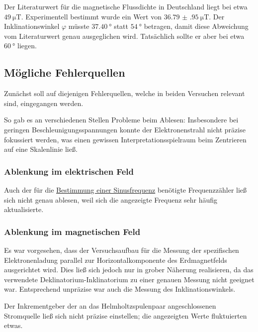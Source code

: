 Der Literaturwert für die magnetische Flussdichte in Deutschland
liegt bei etwa $\SI{49}{\micro\tesla}$. \cite{erdmagnetfeld}
Experimentell bestimmt wurde ein Wert von $\SI{36.79(95)}{\micro\tesla}$.
Der Inklinationswinkel $\varphi$ müsste $\SI{37.40}{\degree}$ statt $\SI{54}{\degree}$ betragen,
damit diese Abweichung vom Literaturwert genau ausgeglichen wird.
Tatsächlich sollte er aber bei etwa $\SI{60}{\degree}$ liegen.

\subsection{Mögliche Fehlerquellen}

Zunächst soll auf diejenigen Fehlerquellen,
welche in beiden Versuchen relevant sind,
eingegangen werden.

So gab es an verschiedenen Stellen Probleme beim Ablesen:
Insbesondere bei geringen Beschleunigungsspannungen konnte der Elektronenstrahl
nicht präzise fokussiert werden,
was einen gewissen Interpretationsspielraum beim Zentrieren auf eine Skalenlinie ließ.


\subsubsection*{Ablenkung im elektrischen Feld}

Auch der für die \hyperref[sec:auswertung:501:frequenz]{Bestimmung einer Sinusfrequenz}
benötigte Frequenzzähler ließ sich nicht genau ablesen,
weil sich die angezeigte Frequenz sehr häufig aktualisierte.


\subsubsection*{Ablenkung im magnetischen Feld}

Es war vorgesehen,
dass der Versuchsaufbau für die Messung der spezifischen Elektronenladung
parallel zur Horizontalkomponente des Erdmagnetfelds ausgerichtet wird.
Dies ließ sich jedoch nur in grober Näherung realisieren,
da das verwendete Deklinatorium-Inklinatorium
zu einer genauen Messung nicht geeignet war.
Entsprechend unpräzise war auch die Messung des Inklinationswinkels.

Der Inkrementgeber der an das Helmholtzspulenpaar angeschlossenen Stromquelle
ließ sich nicht präzise einstellen;
die angezeigten Werte fluktuierten etwas.
